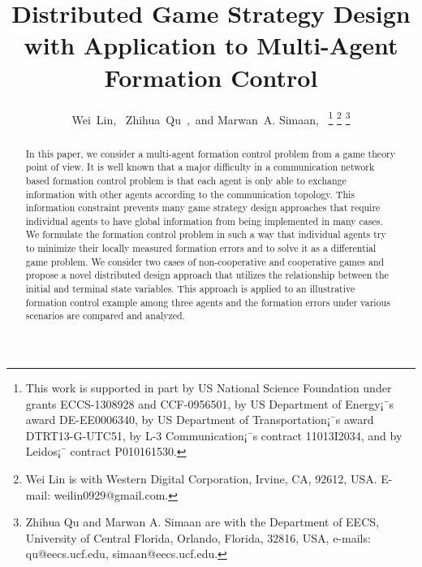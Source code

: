 \documentclass[12pt,draftcls,onecolumn]{IEEEtran}  %
\begin{document}
\title{\LARGE \bf
Distributed Game Strategy Design with Application to Multi-Agent Formation Control}


\author{Wei~Lin,~
        Zhihua~Qu~,~and
        Marwan~A. Simaan,~
\thanks{This work is supported in part by US National Science Foundation under grants ECCS-1308928 and CCF-0956501, by US Department of Energy¡¯s award DE-EE0006340, by US Department of Transportation¡¯s award DTRT13-G-UTC51, by L-3 Communication¡¯s contract 11013I2034, and by Leidos¡¯ contract P010161530.}%
\thanks{Wei Lin is with Western Digital Corporation, Irvine, CA, 92612, USA. E-mail: weilin0929@gmail.com.}
\thanks{Zhihua Qu and Marwan A. Simaan are with the Department of EECS, University of Central Florida, Orlando, Florida, 32816, USA, e-mails: qu@eecs.ucf.edu, simaan@eecs.ucf.edu.}%
%
}



\maketitle

\IEEEpeerreviewmaketitle

\begin{abstract}
In this paper, we consider {a} multi-agent formation control problem from {a} game {theory} point of view. It is well known that a major difficulty in a communication network based formation control problem is that each agent is only able to exchange information {with other agents} according to the communication topology. This information constraint prevents many game strategy design approaches that require individual agents to have global information from being implemented in many cases. We formulate the formation control problem {in such a way that individual agents try to minimize their locally measured formation errors and {to} solve it as a differential game problem}. We consider two cases of non-cooperative and cooperative games and {propose} a novel distributed design approach that utilizes the relationship between the initial and terminal state variables. This approach is applied to an illustrative formation control example among three agents and the formation errors under various scenarios are compared and analyzed.
\end{abstract}
\end{document}
